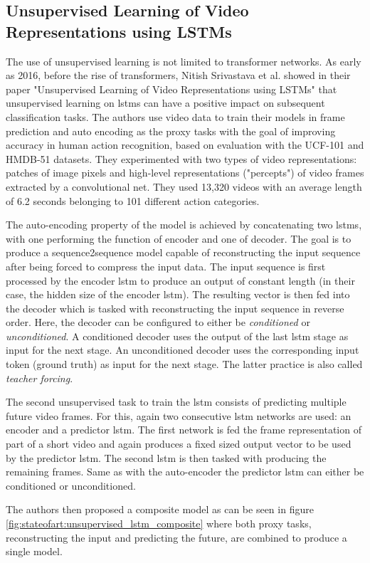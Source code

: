 \subsection{Unsupervised Learning of Video Representations using LSTMs} \label{sec:stateofart:unsupervised_video_lstm}

The use of unsupervised learning is not limited to transformer networks. As early as 2016, before the rise of transformers, Nitish Srivastava et al. showed in their paper "Unsupervised Learning of Video Representations using LSTMs" \cite{unsupervised_learning_lstms} that unsupervised learning on \glspl{lstm} can have a positive impact on subsequent classification tasks. The authors use video data to train their models in frame prediction and auto encoding as the proxy tasks with the goal of improving accuracy in human action recognition, based on evaluation with the UCF-101 and
HMDB-51 datasets. They experimented with two types of video representations: patches of image pixels and high-level representations ("percepts") of video frames extracted by a convolutional net. They used 13,320 videos with an average length of 6.2 seconds belonging to 101 different action categories. \par
The auto-encoding property of the model is achieved by concatenating two \glspl{lstm}, with one performing the function of encoder and one of decoder. The goal is to produce a sequence2sequence model capable of reconstructing the input sequence after being forced to compress the input data. The input sequence is first processed by the encoder \gls{lstm} to produce an output of constant length (in their case, the hidden size of the encoder \gls{lstm}). The resulting vector is then fed into the decoder which is tasked with reconstructing the input sequence in reverse order. Here, the decoder can be configured to either be \textit{conditioned} or \textit{unconditioned}. A conditioned decoder uses the output of the last \gls{lstm} stage as input for the next stage. An unconditioned decoder uses the corresponding input token (ground truth) as input for the next stage. The latter practice is also called \textit{teacher forcing}. \par
The second unsupervised task to train the \gls{lstm} consists of predicting multiple future video frames. For this, again two consecutive \gls{lstm} networks are used: an encoder and a predictor \gls{lstm}. The first network is fed the frame representation of part of a short video and again produces a fixed sized output vector to be used by the predictor \gls{lstm}. The second \gls{lstm} is then tasked with producing the remaining frames. Same as with the auto-encoder the predictor \gls{lstm} can either be conditioned or unconditioned. \par
The authors then proposed a composite model as can be seen in figure \ref{fig:stateofart:unsupervised_lstm_composite} where both proxy tasks, reconstructing the input and predicting the future, are combined to produce a single model.

